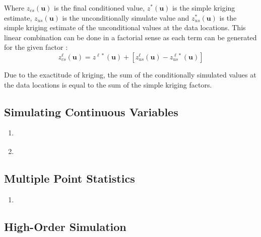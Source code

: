 Where $z_{cs}(\mathbf{u})$ is the final conditioned value, $z^{*}(\mathbf{u})$ is the simple kriging estimate, $z_{us}(\mathbf{u})$ is the unconditionally simulate value and $z_{us}^{*}(\mathbf{u})$ is the simple kriging estimate of the unconditional values at the data locations. This linear combination can be done in a factorial sense as each term can be generated for the given factor \citep{hong2007improved}:
\begin{equation*}
    z_{cs}^{\ell}(\mathbf{u}) = z^{\ell*}(\mathbf{u}) + [z_{us}^{\ell}(\mathbf{u}) - z_{us}^{\ell*}(\mathbf{u})]
\end{equation*}

Due to the exactitude of kriging, the sum of the conditionally simulated values at the data locations is equal to the sum of the simple kriging factors.


\FloatBarrier
\subsection{Simulating Continuous Variables}
\label{subsec:03simulate}

\begin{enumerate}
    \item \cite{gomez-hernandez1993joint,isaaks1990application,goovaerts1997geostatistics}
    \item \cite{pinto2020independent}
\end{enumerate}

\FloatBarrier
\subsection{Multiple Point Statistics}
\label{subsec:01mps}

\begin{enumerate}
    \item\cite{strebelle2002conditional,boisvert2007multiplepoint,tahmasebi2018multiple}
\end{enumerate}


\FloatBarrier
\subsection{High-Order Simulation}
\label{subsec:03hosim}



